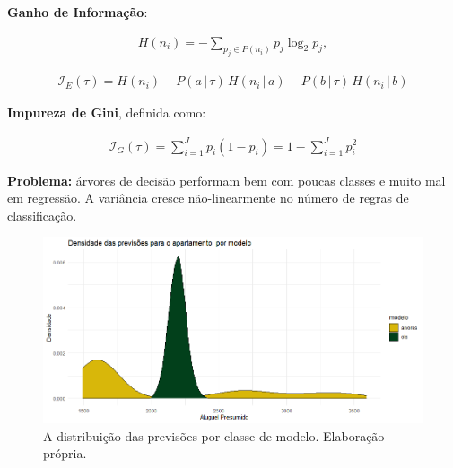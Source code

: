 \documentclass{beamer} %
\newcommand{\I}{\mathcal{I}}
\newcommand{\1}{\mathbb{I}}
\begin{document}
\begin{frame}

\textbf{Ganho de Informação}:

\begin{align}
    H(n_i) = - \sum_{p_j \in P(n_i)} p_j \log_2 p_j, 
\end{align}

\begin{align}
    \I_E(\tau) = H(n_i) - P(a\, |\, \tau) \,H(n_i \, |\,  a) - P(b \,| \,\tau)\, H(n_i \, |\,  b)
\end{align}

\textbf{Impureza de Gini}, definida como:
 
 \begin{align}
     \I_G(\tau) = \sum_{i = 1}^J p_i ( 1  - p_i) =  1 - \sum_{i = 1}^J p_i^2
 \end{align}


\end{frame}



\begin{frame}
\textbf{Problema:} árvores de decisão performam bem com poucas classes e muito mal em regressão. A variância cresce não-linearmente no número de regras de classificação. 


\begin{figure}[H]
    \centering
    \includegraphics[scale = .40]{imagens/exemplo_var_arvores.png}
    \caption{A distribuição das previsões por classe de modelo. Elaboração própria.}
    \label{fig:arvore_var_ols}
\end{figure}
\end{frame}
\end{document}
